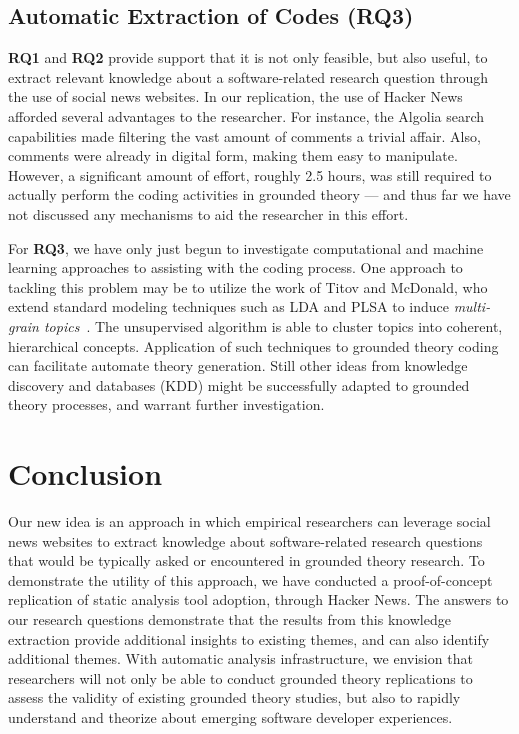 \documentclass{sig-alternate}
\begin{document}
\subsection{Automatic Extraction of Codes (RQ3)}

\textbf{RQ1} and \textbf{RQ2} provide support that it is not only feasible, but also useful, to extract relevant knowledge about a software-related research question through the use of social news websites. In our replication, the use of Hacker News afforded several advantages to the researcher. For instance, the Algolia search capabilities made filtering the vast amount of comments a trivial affair. Also, comments were already in digital form, making them easy to manipulate. However, a significant amount of effort, roughly 2.5 hours, was still required to actually perform the coding activities in grounded theory --- and thus far we have not discussed any mechanisms to aid the researcher in this effort.

For \textbf{RQ3}, we have only just begun to investigate computational and machine learning approaches to assisting with the coding process. One approach to tackling this problem may be to utilize the work of Titov and McDonald, who extend standard modeling techniques such as LDA and PLSA to induce \textit{multi-grain topics}~\cite{Titov2008}. The unsupervised algorithm is able to cluster topics into coherent, hierarchical concepts. Application of such techniques to grounded theory coding can facilitate automate theory generation. Still other ideas from knowledge discovery and databases (KDD) might be successfully adapted to grounded theory processes, and warrant further investigation.

\balance

\section{Conclusion}

Our new idea is an approach in which empirical researchers can leverage social news websites to extract knowledge about software-related research questions that would be typically asked or encountered in grounded theory research. To demonstrate the utility of this approach, we have conducted a proof-of-concept replication of static analysis tool adoption, through Hacker News. The answers to our research questions demonstrate that the results from this knowledge extraction provide additional insights to existing themes, and can also identify additional themes. With automatic analysis infrastructure, we envision that researchers will not only be able to conduct grounded theory replications to assess the validity of existing grounded theory studies, but also to rapidly understand and theorize about  emerging software developer experiences.
\end{document}
